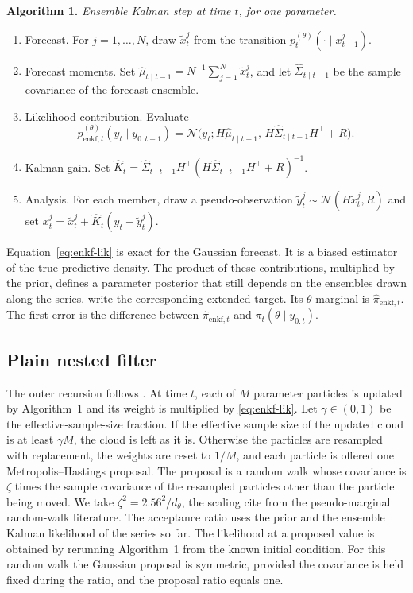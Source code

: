 \medskip
\noindent\textbf{Algorithm 1.} \emph{Ensemble Kalman step at time \(t\), for one parameter.}
\begin{enumerate}
\item Forecast. For \(j = 1, \ldots, N\), draw \(\tilde{x}_t^j\) from the transition \(p_t^{(\theta)}(\cdot \mid x_{t-1}^j)\).
\item Forecast moments. Set \(\hat{\mu}_{t\mid t-1} = N^{-1} \sum_{j=1}^{N} \tilde{x}_t^j\), and let \(\hat{\Sigma}_{t\mid t-1}\) be the sample covariance of the forecast ensemble.
\item Likelihood contribution. Evaluate
\begin{equation}
\label{eq:enkf-lik}
\hat{p}_{\mathrm{enkf},t}^{(\theta)}(y_t \mid y_{0:t-1})
  = \mathcal{N}\bigl(y_t; H\hat{\mu}_{t\mid t-1},\, H\hat{\Sigma}_{t\mid t-1}H^{\top}+R\bigr).
\end{equation}
\item Kalman gain. Set \(\hat{K}_t = \hat{\Sigma}_{t\mid t-1} H^{\top} (H\hat{\Sigma}_{t\mid t-1}H^{\top}+R)^{-1}\).
\item Analysis. For each member, draw a pseudo-observation \(\tilde{y}_t^j \sim \mathcal{N}(H\tilde{x}_t^j, R)\) and set \(x_t^j = \tilde{x}_t^j + \hat{K}_t(y_t - \tilde{y}_t^j)\).
\end{enumerate}

Equation~\eqref{eq:enkf-lik} is exact for the Gaussian forecast. It is a biased estimator of the true predictive density. The product of these contributions, multiplied by the prior, defines a parameter posterior that still depends on the ensembles drawn along the series. \citet[Section~4.1]{golightly2026} write the corresponding extended target. Its \(\theta\)-marginal is \(\hat{\pi}_{\mathrm{enkf},t}\). The first error is the difference between \(\hat{\pi}_{\mathrm{enkf},t}\) and \(\pi_t(\theta \mid y_{0:t})\).

\subsection{Plain nested filter}
\label{sec:plain}

The outer recursion follows \citet[Algorithm~6]{golightly2026}. At time \(t\), each of \(M\) parameter particles is updated by Algorithm~1 and its weight is multiplied by \eqref{eq:enkf-lik}. Let \(\gamma \in (0, 1)\) be the effective-sample-size fraction. If the effective sample size of the updated cloud is at least \(\gamma M\), the cloud is left as it is. Otherwise the particles are resampled with replacement, the weights are reset to \(1/M\), and each particle is offered one Metropolis--Hastings proposal. The proposal is a random walk whose covariance is \(\zeta\) times the sample covariance of the resampled particles other than the particle being moved. We take \(\zeta^{2} = 2.56^{2}/d_{\theta}\), the scaling \citet[Section~4.1]{golightly2026} cite from the pseudo-marginal random-walk literature. The acceptance ratio uses the prior and the ensemble Kalman likelihood of the series so far. The likelihood at a proposed value is obtained by rerunning Algorithm~1 from the known initial condition. For this random walk the Gaussian proposal is symmetric, provided the covariance is held fixed during the ratio, and the proposal ratio equals one.

